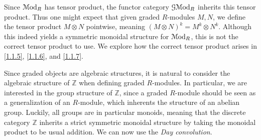 \begin{warning}\label{1.1.4}
	Since $\mathcal{M}\mathrm{od}_R$ has tensor product, the functor category $\mathcal{G} \mathcal{M}\mathrm{od} _R$ inherits this tensor product. Thus one might expect that given graded $R$-modules $M,N$, we define the tensor product $M\otimes N$ pointwise, meaning $(M\otimes N)^k=M^k\otimes N^k$. Although this indeed yields a symmetric monoidal structure for $\mathcal{M}\mathrm{od} _R$, this is not the correct tensor product to use. We explore how the correct tensor product arises in \cref{1.1.5}, \cref{1.1.6}, and \cref{1.1.7}.
\end{warning}

\begin{discussion}\label{1.1.5}
	Since graded objects are algebraic structures, it is natural to consider the algebraic structure of $\mathbb{Z} $ when defining graded $R$-modules. In particular, we are interested in the group structure of $\mathbb{Z} $, since a graded $R$-module should be seen as a generalization of an $R$-module, which inherents the structure of an abelian group. Luckily, all groups are in particular monoids, meaning that the discrete category $\mathbb{Z} $ inherits a strict symmetric monoidal structure by taking the monoidal product to be usual addition. We can now use the \emph{Day convolution}.
\end{discussion}

